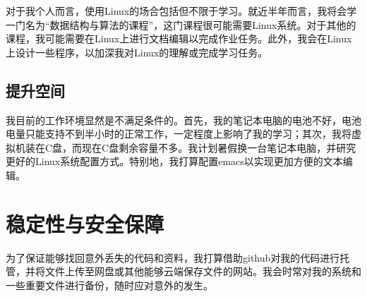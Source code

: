 \documentclass{ctexart}
\begin{document}
对于我个人而言，使用Linux的场合包括但不限于学习。就近半年而言，我将会学一门名为“数据结构与算法的课程”，这门课程很可能需要Linux系统。对于其他的课程，我可能需要在Linux上进行文档编辑以完成作业任务。此外，我会在Linux上设计一些程序，以加深我对Linux的理解或完成学习任务\cite{https://www.jianshu.com/p/d3ac94fda9c2}。

\subsection{提升空间}

我目前的工作环境显然是不满足条件的。首先，我的笔记本电脑的电池不好，电池电量只能支持不到半小时的正常工作，一定程度上影响了我的学习；其次，我将虚拟机装在C盘，而现在C盘剩余容量不多。我计划暑假换一台笔记本电脑，并研究更好的Linux系统配置方式。特别地，我打算配置emacs以实现更加方便的文本编辑。

\section{稳定性与安全保障}

为了保证能够找回意外丢失的代码和资料，我打算借助github对我的代码进行托管，并将文件上传至网盘或其他能够云端保存文件的网站。我会时常对我的系统和一些重要文件进行备份，随时应对意外的发生。\cite{https://cloud.tencent.com/developer/article/1414120}\cite{https://www.zhihu.com/question/51309695}



\end{document}
